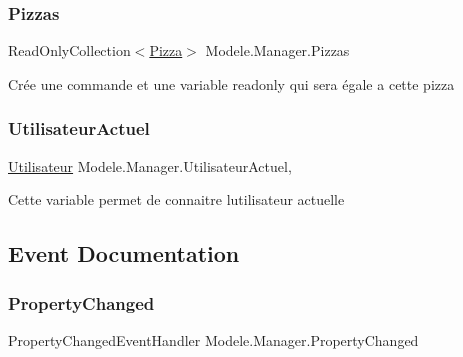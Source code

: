 \mbox{\label{classModele_1_1Manager_a01701f7ed04aac12fd6a623c2e382d0c}} 
\subsubsection{\texorpdfstring{Pizzas}{Pizzas}}
{\footnotesize\ttfamily Read\+Only\+Collection$<$\hyperlink{classModele_1_1Pizza}{Pizza}$>$ Modele.\+Manager.\+Pizzas\hspace{0.3cm}{\ttfamily [get]}}



Crée une commande et une variable readonly qui sera égale a cette pizza 

\mbox{\label{classModele_1_1Manager_aa00c4632bd15b247d6b6793a6797dc82}} 
\subsubsection{\texorpdfstring{Utilisateur\+Actuel}{UtilisateurActuel}}
{\footnotesize\ttfamily \hyperlink{classModele_1_1Utilisateur}{Utilisateur} Modele.\+Manager.\+Utilisateur\+Actuel\hspace{0.3cm}{\ttfamily [get]}, {\ttfamily [set]}}



Cette variable permet de connaitre l\textquotesingle{}utilisateur actuelle 



\subsection{Event Documentation}
\mbox{\label{classModele_1_1Manager_aebe3fac90190bcb0f688187821705730}} 
\subsubsection{\texorpdfstring{Property\+Changed}{PropertyChanged}}
{\footnotesize\ttfamily Property\+Changed\+Event\+Handler Modele.\+Manager.\+Property\+Changed}



